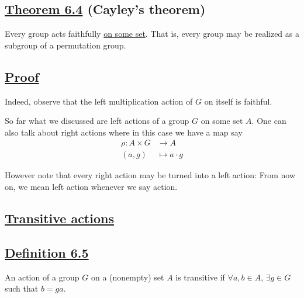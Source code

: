 \vspace{1em}

\subsection*{\underline{Theorem 6.4} (Cayley's theorem)}
Every group acts faithfully \underline{on some set}. That is, every group may be realized as a subgroup of a permutation group.

\vspace{1em}

\subsection*{\underline{Proof}}
Indeed, observe that the left multiplication action of $G$ on itself is faithful.

\vspace{1.5em}


\vspace{3em}

So far what we discussed are left actions of a group $G$ on some set $A$. One can also talk about right actions where in this case we have a map say
\begin{align*}
\rho : A \times G &\longrightarrow A \\
(a, g) &\longmapsto a \cdot g
\end{align*}


However note that every right action may be turned into a left action: From now on, we mean left action whenever we say action.

\vspace{1em}

\subsection*{\underline{Transitive actions}}

\subsection*{\underline{Definition 6.5}}
An action of a group $G$ on a (nonempty) set $A$ is transitive if $\forall a, b \in A$, $\exists g \in G$ such that $b = ga$.

\vspace{1em}

